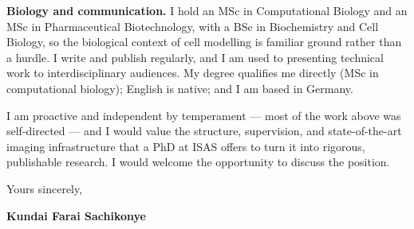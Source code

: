 \documentclass[12pt,a4paper]{article}
\begin{document}
\textbf{Biology and communication.}
I hold an MSc in Computational Biology and an MSc in Pharmaceutical Biotechnology,
with a BSc in Biochemistry and Cell Biology, so the biological context of cell
modelling is familiar ground rather than a hurdle. I write and publish regularly,
and I am used to presenting technical work to interdisciplinary audiences. My
degree qualifies me directly (MSc in computational biology); English is native;
and I am based in Germany.

I am proactive and independent by temperament --- most of the work above was
self-directed --- and I would value the structure, supervision, and
state-of-the-art imaging infrastructure that a PhD at ISAS offers to turn it into
rigorous, publishable research. I would welcome the opportunity to discuss the
position.

\vspace{1.5em}
Yours sincerely,

\vspace{2.5em}
\textbf{Kundai Farai Sachikonye}
\end{document}
